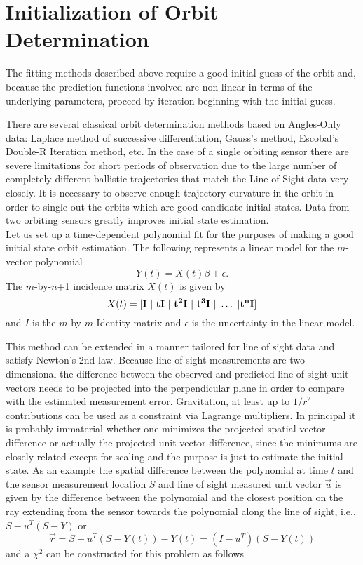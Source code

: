 \section{Initialization of Orbit Determination}
The fitting methods described above require a good initial guess of the orbit and, because the prediction functions involved are non-linear in terms of the underlying parameters, proceed by iteration beginning with the initial guess. 

There are several classical orbit determination methods based on Angles-Only data: Laplace method of successive differentiation, Gauss's method, Escobal's Double-R Iteration method, etc. In the case of a single orbiting sensor there are severe limitations for short periods of observation due to the large number of completely different ballistic trajectories that match the Line-of-Sight data very closely. It is necessary to observe enough trajectory curvature in the orbit in order to single out the orbits which are good candidate initial states. Data from two orbiting sensors greatly improves initial state estimation.\\

Let us set up a time-dependent polynomial fit for the purposes of making a good initial state orbit estimation. The following represents a linear model for the $m$-vector polynomial 
$$Y(t) = X(t) \beta  + \epsilon.$$ The $m$-by-$n$+1 incidence matrix $X(t)$ is given by $$X(t) = [ \bf{I}~ |~ t \bf{I}~ |~ t^2 \bf{I}~|~ t^3 \bf{I}~|~ \hdots~ | t^n \bf{I} ] $$ and $I$ is the $m$-by-$m$ Identity matrix and $\epsilon$ is the uncertainty in the linear model. 

This method can be extended in a manner tailored for line of sight data and satisfy Newton's 2nd law. Because line of sight measurements are two dimensional the difference between the observed and predicted line of sight unit vectors needs to be projected into the perpendicular plane in order to compare with the estimated measurement error. Gravitation, at least up to $1/r^2$ contributions can be used as a constraint via Lagrange multipliers. In principal it is probably immaterial whether one minimizes the projected spatial vector difference or actually the projected unit-vector difference, since the minimums are closely related except for scaling and the purpose is just to estimate the initial state. As an example the spatial difference between the polynomial at time $t$ and the sensor measurement location $S$ and line of sight measured unit vector $\vec{u}$ is given by the difference between the polynomial and the closest position on the ray extending from the sensor towards the polynomial along the line of sight, i.e., $S - u^T(S-Y)$ or
$$\vec{r} = S - u^T(S-Y(t)) - Y(t) = (I - u^T)(S-Y(t))$$ and a $\chi^2$ can be constructed for this problem as follows

